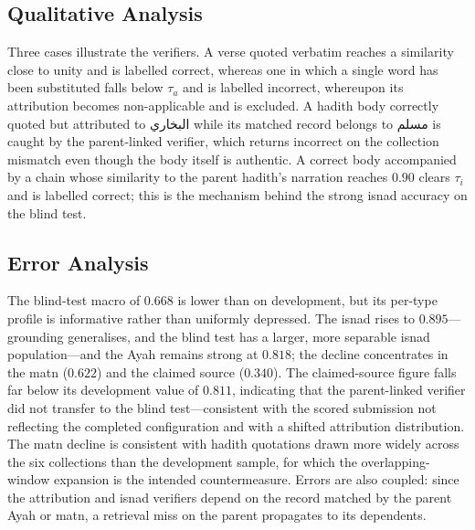 \documentclass[11pt]{article}
\newcommand{\ar}[1]{\foreignlanguage{arabic}{#1}}
\begin{document}
\subsection{Qualitative Analysis}
Three cases illustrate the verifiers. A verse quoted verbatim reaches a similarity close to unity and
is labelled correct, whereas one in which a single word has been substituted falls below $\tau_a$ and
is labelled incorrect, whereupon its attribution becomes non-applicable and is excluded. A hadith body
correctly quoted but attributed to \ar{البخاري} while its matched record belongs to \ar{مسلم} is
caught by the parent-linked verifier, which returns incorrect on the collection mismatch even though
the body itself is authentic. A correct body accompanied by a chain whose similarity to the parent
hadith's narration reaches $0.90$ clears $\tau_i$ and is labelled correct; this is the mechanism behind
the strong isnad accuracy on the blind test.

\subsection{Error Analysis}
The blind-test macro of $0.668$ is lower than on development, but its per-type profile is informative
rather than uniformly depressed. The isnad rises to $0.895$---grounding generalises, and the blind
test has a larger, more separable isnad population---and the Ayah remains strong at $0.818$; the
decline concentrates in the matn ($0.622$) and the claimed source ($0.340$). The claimed-source figure
falls far below its development value of $0.811$, indicating that the parent-linked verifier did not
transfer to the blind test---consistent with the scored submission not reflecting the completed
configuration and with a shifted attribution distribution. The matn decline
is consistent with hadith quotations drawn more widely across the six collections than the development
sample, for which the overlapping-window expansion is the intended countermeasure. Errors are also
coupled: since the attribution and isnad verifiers depend on the record matched by the parent Ayah or
matn, a retrieval miss on the parent propagates to its dependents.
\end{document}
